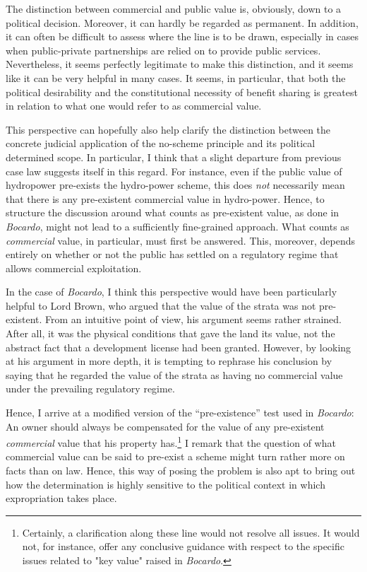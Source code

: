 The distinction between commercial and public value is, obviously, down to a political decision. Moreover, it can hardly be regarded as permanent. In addition, it can often be difficult to assess where the line is to be drawn, especially in cases when public-private partnerships are relied on to provide public services. Nevertheless, it seems perfectly legitimate to make this distinction, and it seems like it can be very helpful in many cases. It seems, in particular, that both the political desirability and the constitutional necessity of benefit sharing is greatest in relation to what one would refer to as commercial value. 

This perspective can hopefully also help clarify the distinction between the concrete judicial application of the no-scheme principle and its political determined scope. In particular, I think that a slight departure from previous case law suggests itself in this regard. For instance, even if the public value of hydropower pre-exists the hydro-power scheme, this does \emph{not} necessarily mean that there is any pre-existent commercial value in hydro-power. Hence, to structure the discussion around what counts as pre-existent value, as done in {\it Bocardo}, might not lead to a sufficiently fine-grained approach.  What counts as {\it commercial} value, in particular, must first be answered. This, moreover, depends entirely on whether or not the public has settled on a regulatory regime that allows commercial exploitation.

In the case of {\it Bocardo}, I think this perspective would have been particularly helpful to Lord Brown, who argued that the value of the strata was not pre-existent. From an intuitive point of view, his argument seems rather strained. After all, it was the physical conditions that gave the land its value, not the abstract fact that a development license had been granted. However, by looking at his argument in more depth, it is tempting to rephrase his conclusion by saying that he regarded the value of the strata as having no commercial value under the prevailing regulatory regime.

Hence, I arrive at a modified version of the ``pre-existence'' test used in \emph{Bocardo}: An owner should always be compensated for the value of any pre-existent \emph{commercial} value that his property has.\footnote{Certainly, a clarification along these line would not resolve all issues. It would not, for instance, offer any conclusive guidance with respect to the specific issues related to "key value" raised in \emph{Bocardo}.} I remark that the question of what commercial value can be said to pre-exist a scheme might turn rather more on facts than on law. Hence, this way of posing the problem is also apt to bring out how the determination is highly sensitive to the political context in which expropriation takes place.

